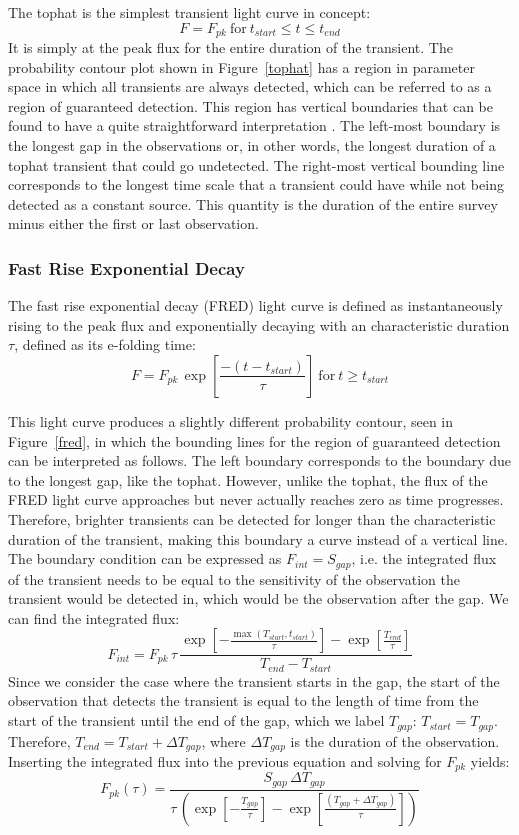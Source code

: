 \documentclass[12pt]{article}
\begin{document}
The tophat is the simplest transient light curve in concept:
\[F=F_{pk}~\text{for}~t_{start} \le t \le t_{end}\]
It is simply at the peak flux for the entire duration of the transient. The probability contour plot shown in Figure~\ref{tophat} has a region in parameter space in which all transients are always detected, which can be referred to as a region of guaranteed detection. This region has vertical boundaries that can be found to have a quite straightforward interpretation \citep{2017MNRAS.465.4106C}. The left-most boundary is the longest gap in the observations or, in other words, the longest duration of a tophat transient that could go undetected. The right-most vertical bounding line corresponds to the longest time scale that a transient could have while not being detected as a constant source. This quantity is the duration of the entire survey minus either the first or last observation. 

\subsubsection{Fast Rise Exponential Decay}
The fast rise exponential decay (FRED) light curve is defined as instantaneously rising to the peak flux and exponentially decaying with an characteristic duration $\tau$, defined as its e-folding time:
\[F=F_{pk}\,\exp\left[\frac{-(t-t_{start})}{\tau}\right]~\text{for}~t\ge t_{start}\]

This light curve produces a slightly different probability contour, seen in Figure~\ref{fred}, in which the bounding lines for the region of guaranteed detection can be interpreted as follows. The left boundary corresponds to the boundary due to the longest gap, like the tophat. However, unlike the tophat, the flux of the FRED light curve approaches but never actually reaches zero as time progresses. Therefore, brighter transients can be detected for longer than the characteristic duration of the transient, making this boundary a curve instead of a vertical line. The boundary condition can be expressed as $F_{int}=S_{gap}$, i.e. the integrated flux of the transient needs to be equal to the sensitivity of the observation the transient would be detected in, which would be the observation after the gap. We can find the integrated flux:
\[F_{int} = F_{pk}\,\tau\,\frac{\exp\left[-\frac{\max(T_{start},t_{start})}{\tau}\right] - \exp\left[\frac{T_{end}}{\tau}\right]}{T_{end}-T_{start}}\]
Since we consider the case where the transient starts in the gap, the start of the observation that detects the transient is equal to the length of time from the start of the transient until the end of the gap, which we label $T_{gap}$: $T_{start}=T_{gap}$. 
Therefore, $T_{end}=T_{start}+\Delta T_{gap}$, where $\Delta T_{gap}$ is the duration of the observation. Inserting the integrated flux into the previous equation and solving for $F_{pk}$ yields:
\[F_{pk}(\tau) = \frac{S_{gap}\,\Delta T_{gap}}{\tau\,\left(\exp\left[-\frac{T_{gap}}{\tau}\right] - \exp\left[\frac{(T_{gap} + \Delta T_{gap})}{\tau}\right]\right)}\]
\end{document}
